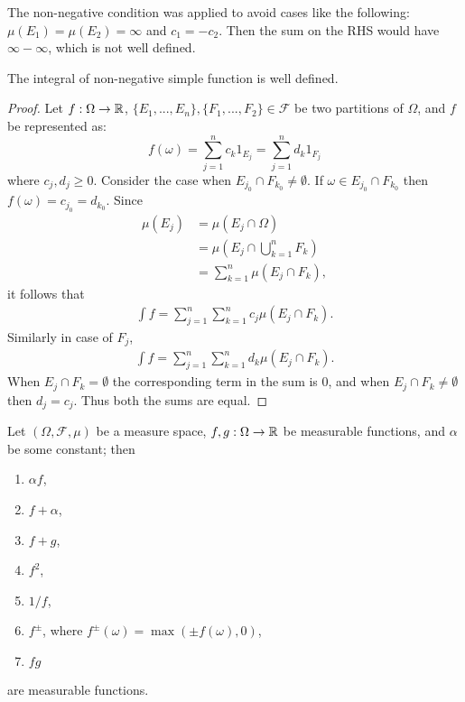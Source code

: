 The non-negative condition was applied to avoid cases like the following: $\mu(E_1)= \mu(E_2)= \infty$ and $c_1 = -c_2$. Then the sum on the RHS would have $\infty - \infty$, which is not well defined.  
\begin{proposition}
  The integral of non-negative simple function is well defined.
\end{proposition}
\begin{proof}
  Let $f:\Omega\to\mathbb{R}$, $\{E_1,...,E_n\}, \{F_1,...,F_2\}\in \mathscr{F}$ be two partitions of $\Omega$, and $f$ be represented as:
  \[f(\omega) = \sum_{j=1}^n c_k 1_{E_j} = \sum_{j=1}^n d_k 1_{F_j}\]
  where $c_j,d_j\geq 0$. Consider the case when $E_{j_0}\cap F_{k_0} \neq \emptyset$. If $\omega \in E_{j_0}\cap F_{k_0}$ then $f(\omega) = c_{j_0} = d_{k_0}$. Since
  \begin{align*}
    \mu(E_j) &= \mu(E_j \cap \Omega)\\
          &= \mu(E_j \cap \bigcup_{k=1}^n F_k)\\
          &= \sum_{k=1}^n \mu(E_j\cap F_k),
  \end{align*}
  it follows that
  \begin{align*}
    \int f = \sum_{j=1}^n \sum_{k=1}^n c_j \mu(E_j\cap F_k).
  \end{align*}
  Similarly in case of $F_j$,
  \begin{align*}
    \int f = \sum_{j=1}^n \sum_{k=1}^n d_k \mu(E_j\cap F_k).
  \end{align*}
  When $E_j\cap F_k = \emptyset$ the corresponding term in the sum is $0$, and when $E_j\cap F_k \neq \emptyset$ then $d_j=c_j$. Thus both the sums are equal. 
\end{proof}
\begin{lemma}
  Let $(\Omega, \mathscr{F}, \mu)$ be a measure space, $f,g: \Omega \to \mathbb{R}$ be measurable functions, and $\alpha$ be some constant; then
  \begin{enumerate}
    \item $\alpha f$, 
    \item $f + \alpha$, 
    \item $f+g$,
    \item $f^2$,
    \item $1/f$,
    \item $f^\pm$, where $f^\pm(\omega) = \max(\pm f(\omega), 0)$,
    \item $fg$
  \end{enumerate}
  are measurable functions.
\end{lemma}
